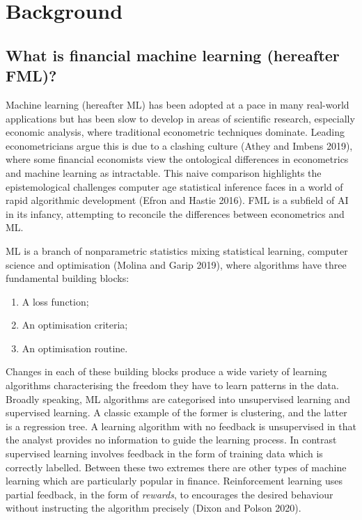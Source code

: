 \documentclass{article}
\begin{document}
\hypertarget{background}{%
\section{Background}\label{background}}

\hypertarget{what-is-financial-machine-learning-hereafter-fml}{%
\subsection{What is financial machine learning (hereafter
FML)?}\label{what-is-financial-machine-learning-hereafter-fml}}

Machine learning (hereafter ML) has been adopted at a pace in many
real-world applications but has been slow to develop in areas of
scientific research, especially economic analysis, where traditional
econometric techniques dominate. Leading econometricians argue this is
due to a clashing culture (Athey and Imbens 2019), where some financial
economists view the ontological differences in econometrics and machine
learning as intractable. This naive comparison highlights the
epistemological challenges computer age statistical inference faces in a
world of rapid algorithmic development (Efron and Hastie 2016). FML is a
subfield of AI in its infancy, attempting to reconcile the differences
between econometrics and ML.

ML is a branch of nonparametric statistics mixing statistical learning,
computer science and optimisation (Molina and Garip 2019), where
algorithms have three fundamental building blocks:

\begin{enumerate}
\def\labelenumi{\arabic{enumi}.}
\tightlist
\item
  A loss function;
\item
  An optimisation criteria;
\item
  An optimisation routine.
\end{enumerate}

Changes in each of these building blocks produce a wide variety of
learning algorithms characterising the freedom they have to learn
patterns in the data. Broadly speaking, ML algorithms are categorised
into unsupervised learning and supervised learning. A classic example of
the former is clustering, and the latter is a regression tree. A
learning algorithm with no feedback is unsupervised in that the analyst
provides no information to guide the learning process. In contrast
supervised learning involves feedback in the form of training data which
is correctly labelled. Between these two extremes there are other types
of machine learning which are particularly popular in finance.
Reinforcement learning uses partial feedback, in the form of
\emph{rewards}, to encourages the desired behaviour without instructing
the algorithm precisely (Dixon and Polson 2020).
\end{document}
